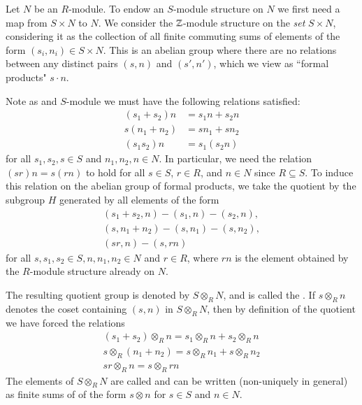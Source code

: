 \begin{construction}
    Let $N$ be an $R$-module. To endow an $S$-module structure on $N$ we first need a map from $S\times N$ to $N$. We consider the $\mathbb Z$-module structure on the \emph{set} $S\times N$, considering it as the collection of all finite commuting sums of elements of the form $(s_i,n_i) \in S\times N$. This is an abelian group where there are no relations between any distinct pairs $(s,n)$ and $(s',n')$, which we view as ``formal products" $s\cdot n$. 

    Note as and $S$-module we must have the following relations satisfied: \begin{align*}
        (s_1+s_2)n &= s_1n+s_2n \\
        s(n_1+n_2) &= sn_1+sn_2 \\
        (s_1s_2)n &= s_1(s_2n)
    \end{align*}
    for all $s_1,s_2,s \in S$ and $n_1,n_2,n \in N$. In particular, we need the relation $(sr)n = s(rn)$ to hold for all $s \in S$, $r \in R$, and $n \in N$ since $R \subseteq S$. To induce this relation on the abelian group of formal products, we take the quotient by the subgroup $H$ generated by all elements of the form \begin{equation*}
        \begin{array}{c}
            (s_1+s_2,n) - (s_1,n) - (s_2,n), \\
            (s,n_1+n_2) - (s,n_1) - (s,n_2), \\
            (sr,n) - (s,rn) 
        \end{array}
    \end{equation*}
    for all $s,s_1,s_2 \in S, n, n_1,n_2 \in N$ and $r \in R$, where $rn$ is the element obtained by the $R$-module structure already on $N$.


    The resulting quotient group is denoted by $S\otimes_R N$, and is called the . If $s\otimes_R n$ denotes the coset containing $(s,n)$ in $S\otimes_R N$, then by definition of the quotient we have forced the relations \begin{equation*}
        \begin{array}{c}
            (s_1+s_2)\otimes_Rn = s_1\otimes_R n + s_2\otimes_R n \\
            s\otimes_R(n_1+n_2) = s\otimes_R n_1+s\otimes_Rn_2 \\
            sr\otimes_R n = s\otimes_Rrn
        \end{array}
    \end{equation*}
    The elements of $S\otimes_RN$ are called  and can be written (non-uniquely in general) as finite sums of  of the form $s\otimes n$ for $s \in S$ and $n \in N$.


\end{construction}

